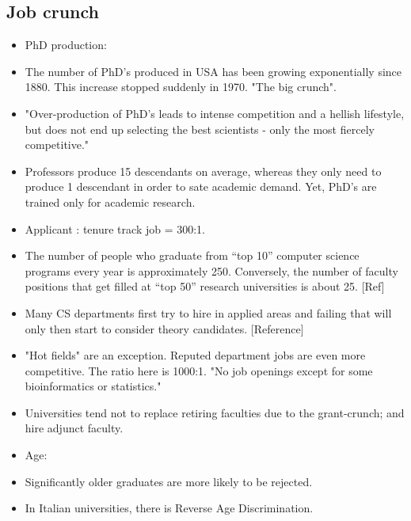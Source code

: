 \documentclass[oneside, article]{memoir}
\begin{document}
\subsection{Job crunch}
\begin{itemize}
\item PhD production:
\item The number of PhD's produced in USA has been growing exponentially since 1880. This increase stopped suddenly in 1970. "The big crunch".
\item "Over-production of PhD's leads to intense competition and a hellish lifestyle, but does not end up selecting the best scientists - only the most fiercely competitive."
\item Professors produce 15 descendants on average, whereas they only need to produce 1 descendant in order to sate academic demand. Yet, PhD's are trained only for academic research.

\item Applicant : tenure track job = 300:1.
\item The number of people who graduate from “top 10” computer science programs every year is approximately 250. Conversely, the number of faculty positions that get filled at “top 50” research universities is about 25. [Ref]
\item Many CS departments first try to hire in applied areas and failing that will only then start to consider theory candidates. [Reference]
\item "Hot fields" are an exception. Reputed department jobs are even more competitive. The ratio here is 1000:1. "No job openings except for some bioinformatics or statistics."
\item Universities tend not to replace retiring faculties due to the grant-crunch; and hire adjunct faculty.
\item Age:
\item Significantly older graduates are more likely to be rejected.
\item In Italian universities, there is Reverse Age Discrimination.
\end{itemize}
\end{document}
